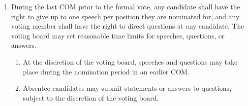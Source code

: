\documentclass[11pt]{article}
\newcounter{h1}
\newcounter{h2}[h1]
\newcounter{h3}[h2]
\begin{document}
\begin{enumerate}
  \item During the last COM prior to the formal vote, any candidate shall have the right to give up to one speech per position they are nominated for, and any voting member shall have the right to direct questions at any candidate. The voting board may set reasonable time limits for speeches, questions, or answers.  
  \begin{enumerate}
    \item At the discretion of the voting board, speeches and questions may take place during the nomination period in an earlier COM.  
    \item Absentee candidates may submit statements or answers to questions, subject to the discretion of the voting board.
  \end{enumerate}
\end{enumerate}

\end{document}
